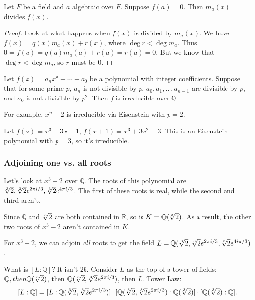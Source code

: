\documentclass{scrartcl}
\begin{document}
\begin{theorem}
Let $F$ be a field and $a$ algebraic over $F$. Suppose $f(a) = 0.$ Then $m_a(x)$ divides $f(x)$.
\end{theorem}

\begin{proof}
    Look at what happens when $f(x)$ is divided by $m_a(x)$. We have $f(x) = q(x)m_a(x) + r(x)$, where $\deg r < \deg m_a$. Thus $0 = f(a) = q(a) m_a(a) + r(a) = r(a) = 0$. But we know that $\deg r < \deg m_a$, so $r$ must be $0$.
\end{proof}

\begin{theorem}
    Let $f(x) = a_nx^n + \cdots + a_0$ be a polynomial with integer coefficients. Suppose that for some prime $p$, $a_n$ is not divisible by $p$, $a_0, a_1, \dotsc, a_{n-1}$ are divisible by $p$, and $a_0$ is not divisible by $p^2$. Then $f$ is irreducible over $\mathbb{Q}$.
\end{theorem}

For example, $x^n - 2$ is irreducible via Eisenstein with $p=2$.

\begin{example}
    Let $f(x) = x^3 - 3x - 1$, $f(x+1) = x^3 + 3x^2 - 3$. This is an Eisenstein polynomial with $p=3$, so it's irreducible.
\end{example}

\subsubsection{Adjoining one vs. all roots}
Let's look at $x^3-2$ over $\mathbb{Q}$. The roots of this polynomial are $\sqrt[3]{2}, \sqrt[3]{2} e^{2\pi i/3}, \sqrt[3]{2}e^{4\pi i/3}$. The first of these roots is real, while the second and third aren't.

Since $\mathbb{Q}$ and $\sqrt[3]{2}$ are both contained in $\mathbb{R}$, so is $K = \mathbb{Q}(\sqrt[3]{2})$. As a result, the other two roots of $x^3-2$ aren't contained in $K$.

For $x^3-2$, we can adjoin \textit{all} roots to get the field $L = \mathbb{Q}(\sqrt[3]{2}, \sqrt[3]{2}e^{2\pi i/3}, \sqrt[3]{2}e^{4i\pi/3})$.

What is $[L:\mathbb{Q}]$? It isn't 26. Consider $L$ as the top of a tower of fields: $\mathbb{Q}, then \mathbb{Q}(\sqrt[3]{2})$, then $\mathbb{Q}(\sqrt[3]{2}, \sqrt[3]{2}e^{2\pi i/3})$, then $L$. Tower Law: $$[L:\mathbb{Q}] = [L:\mathbb{Q} (\sqrt[3]{2}, \sqrt[3]{2}e^{2\pi i/3})] \cdot [\mathbb{Q} (\sqrt[3]{2}, \sqrt[3]{2}e^{2\pi i/3}) : \mathbb{Q} (\sqrt[3]{2})] \cdot [\mathbb{Q}(\sqrt[3]{2}) : \mathbb{Q}].$$
\end{document}
